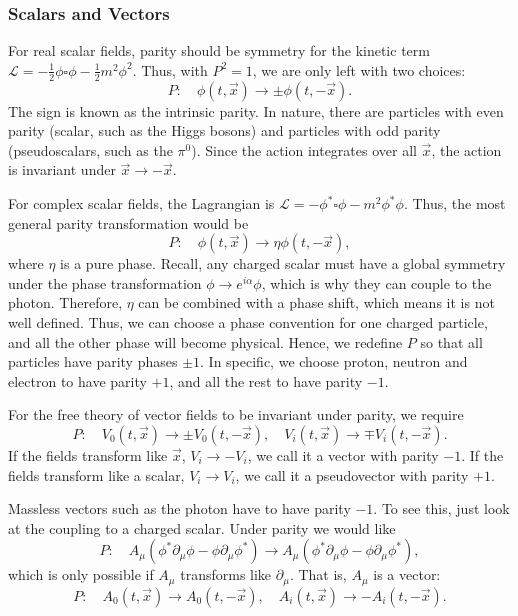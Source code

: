 \documentclass[11pt]{article}
\theoremstyle{definition}
\begin{document}
\subsubsection{Scalars and Vectors}
For real scalar fields, parity should be symmetry for the kinetic term $\mathcal{L} = -\frac{1}{2}\phi\square\phi - \frac{1}{2}m^2\phi^2$. Thus, with $P^2=1$, we are only left with two choices:
\begin{equation}
    P: \quad \phi(t,\vec{x}) \rightarrow \pm \phi(t,-\vec{x}).
\end{equation}
The sign is known as the intrinsic parity. In nature, there are particles with even parity (scalar, such as the Higgs bosons) and particles with odd parity (pseudoscalars, such as the $\pi^0$). Since the action integrates over all $\vec{x}$, the action is invariant under $\vec{x} \rightarrow -\vec{x}$.

For complex scalar fields, the Lagrangian is $\mathcal{L} = -\phi^*\square\phi - m^2\phi^*\phi$. Thus, the most general parity transformation would be
\begin{equation}
    P: \quad \phi(t,\vec{x}) \rightarrow \eta \phi(t,-\vec{x}),
\end{equation}
where $\eta$ is a pure phase. Recall, any charged scalar must have a global symmetry under the phase transformation $\phi \rightarrow e^{i\alpha}\phi$, which is why they can couple to the photon. Therefore, $\eta$ can be combined with a phase shift, which means it is not well defined. Thus, we can choose a phase convention for one charged particle, and all the other phase will become physical. Hence, we redefine $P$ so that all particles have parity phases $\pm1$. In specific, we choose proton, neutron and electron to have parity $+1$, and all the rest to have parity $-1$.

For the free theory of vector fields to be invariant under parity, we require
\begin{equation}
    P: \quad V_0(t,\vec{x}) \rightarrow \pm V_0(t,-\vec{x}), \quad V_i(t,\vec{x}) \rightarrow \mp V_i(t,-\vec{x}).
\end{equation}
If the fields transform like $\vec{x}$, $V_i \rightarrow -V_i$, we call it a vector with parity $-1$. If the fields transform like a scalar, $V_i \rightarrow V_i$, we call it a pseudovector with parity $+1$. 

Massless vectors such as the photon have to have parity \(-1\). To see this, just look at the coupling to a charged scalar. Under parity we would like
\begin{equation}
P : \quad A_\mu (\phi^* \partial_\mu \phi - \phi \partial_\mu \phi^*) \rightarrow A_\mu (\phi^* \partial_\mu \phi - \phi \partial_\mu \phi^*),
\end{equation}
which is only possible if \(A_\mu\) transforms like \(\partial_\mu\). That is, \(A_\mu\) is a vector:
\begin{equation}
P : \quad A_0 (t, \vec{x}) \to A_0 (t, -\vec{x}), \quad A_i (t, \vec{x}) \to -A_i (t, -\vec{x}).
\end{equation}
\end{document}
